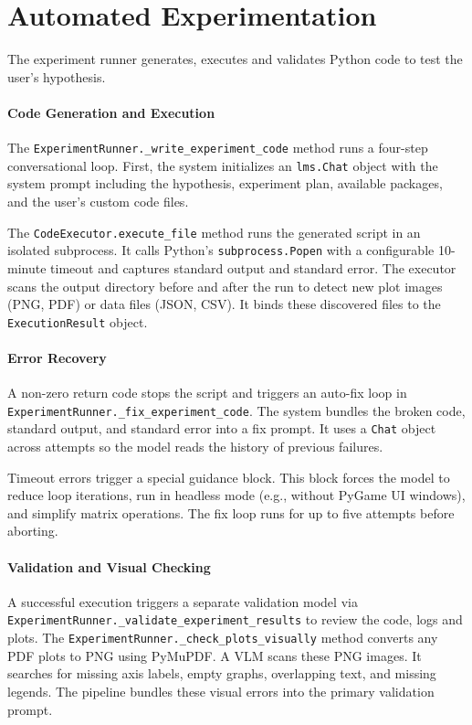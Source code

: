 \section{Automated Experimentation}
The experiment runner generates, executes and validates Python code to test the user's hypothesis.

\paragraph{Code Generation and Execution}
The \texttt{ExperimentRunner.\_write\_experiment\_code} method runs a four-step conversational loop.
First, the system initializes an \texttt{lms.Chat} object with the system prompt including the hypothesis, experiment plan, available packages, and the user's custom code files.

The \texttt{CodeExecutor.execute\_file} method runs the generated script in an isolated subprocess.
It calls Python's \texttt{subprocess.Popen} with a configurable 10-minute timeout and captures standard output and standard error.
The executor scans the output directory before and after the run to detect new plot images (PNG, PDF) or data files (JSON, CSV).
It binds these discovered files to the \texttt{ExecutionResult} object.

\paragraph{Error Recovery}
A non-zero return code stops the script and triggers an auto-fix loop in \texttt{ExperimentRunner.\_fix\_experiment\_code}.
The system bundles the broken code, standard output, and standard error into a fix prompt.
It uses a \texttt{Chat} object across attempts so the model reads the history of previous failures.

Timeout errors trigger a special guidance block.
This block forces the model to reduce loop iterations, run in headless mode (e.g., without PyGame UI windows), and simplify matrix operations.
The fix loop runs for up to five attempts before aborting.

\paragraph{Validation and Visual Checking}
A successful execution triggers a separate validation model via \texttt{ExperimentRunner.\_validate\_experiment\_results} to review the code, logs and plots.
The \texttt{ExperimentRunner.\_check\_plots\_visually} method converts any PDF plots to PNG using PyMuPDF.
A VLM scans these PNG images.
It searches for missing axis labels, empty graphs, overlapping text, and missing legends.
The pipeline bundles these visual errors into the primary validation prompt.

